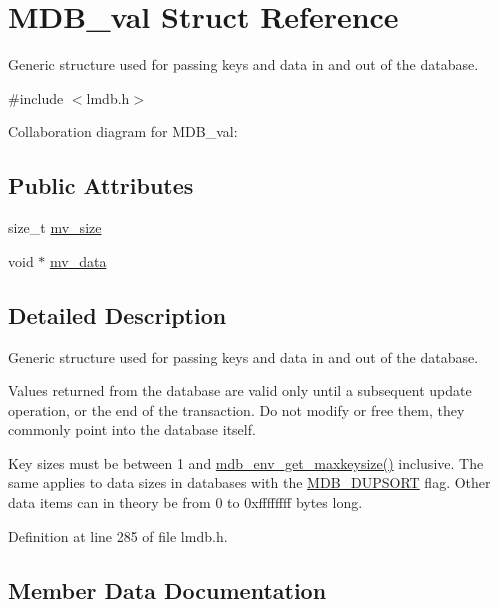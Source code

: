\hypertarget{struct_m_d_b__val}{}\section{M\+D\+B\+\_\+val Struct Reference}
\label{struct_m_d_b__val}


Generic structure used for passing keys and data in and out of the database.  




{\ttfamily \#include $<$lmdb.\+h$>$}



Collaboration diagram for M\+D\+B\+\_\+val\+:
\subsection*{Public Attributes}
\begin{DoxyCompactItemize}
\item 
size\+\_\+t \mbox{\hyperlink{struct_m_d_b__val_a9e788910dc056d0cff8915672084dabe}{mv\+\_\+size}}
\item 
void $\ast$ \mbox{\hyperlink{struct_m_d_b__val_a98af99191878ec0a2179482f4e831b91}{mv\+\_\+data}}
\end{DoxyCompactItemize}


\subsection{Detailed Description}
Generic structure used for passing keys and data in and out of the database. 

Values returned from the database are valid only until a subsequent update operation, or the end of the transaction. Do not modify or free them, they commonly point into the database itself.

Key sizes must be between 1 and \mbox{\hyperlink{group__mdb_gaaf0be004f33828bf2fb09d77eb3cef94}{mdb\+\_\+env\+\_\+get\+\_\+maxkeysize()}} inclusive. The same applies to data sizes in databases with the \mbox{\hyperlink{group__mdb__dbi__open_gae0626566c2562e9007f5c8c9535bab1a}{M\+D\+B\+\_\+\+D\+U\+P\+S\+O\+RT}} flag. Other data items can in theory be from 0 to 0xffffffff bytes long. 

Definition at line 285 of file lmdb.\+h.



\subsection{Member Data Documentation}
\mbox{\label{struct_m_d_b__val_a98af99191878ec0a2179482f4e831b91}} 
